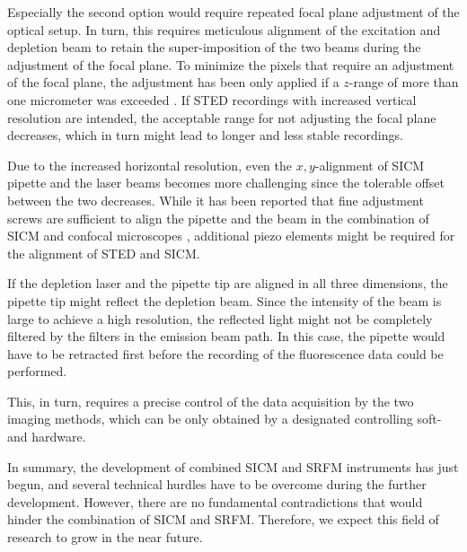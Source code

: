 Especially the second option would require repeated
focal plane adjustment of the optical setup. In turn, this requires meticulous
alignment of the excitation and depletion beam to retain the super-imposition
of the two beams during the adjustment of the focal plane. To minimize the
pixels that require an adjustment of the focal plane, the adjustment has been
only applied if a $z$-range of more than one micrometer was exceeded
\cite{Novak2014}. If STED recordings with increased vertical resolution are
intended, the acceptable range for not adjusting the focal plane decreases,
which in turn might lead to longer and less stable recordings. 

Due to the increased horizontal resolution, even the $x,y$-alignment of SICM
pipette and the laser beams becomes more challenging since the tolerable
offset between the two decreases. While it has been reported that fine
adjustment screws are sufficient to align the pipette and the beam in the
combination of SICM and confocal microscopes \cite{Gorelik2002a,
  Shevchuk2008,Novak2014}, additional piezo elements might be required for the
alignment of STED and SICM.

If the depletion laser and the pipette tip are aligned in all three
dimensions, the pipette tip might reflect the depletion beam. Since the
intensity of the beam is large to achieve a high resolution, the reflected
light might not be completely filtered by the filters in the emission beam
path. In this case, the pipette would have to be retracted first before the
recording of the fluorescence data could be performed.

This, in turn, requires a precise control of the data acquisition by the two
imaging methods, which can be only obtained by a designated controlling soft-
and hardware.

In summary, the development of combined SICM and SRFM instruments has just
begun, and several technical hurdles have to be overcome during the
further development. However, there are no fundamental contradictions that
would hinder the combination of SICM and SRFM. Therefore, we expect this field
of research to grow in the near future.     


